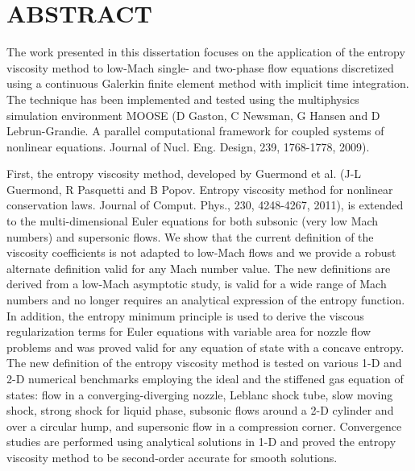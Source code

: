 %
%
%

\chapter*{ABSTRACT}

\pagestyle{plain} %
\setcounter{page}{2}

The work presented in this dissertation focuses on the application of the entropy viscosity method to low-Mach single- and two-phase flow equations discretized using a continuous Galerkin finite element method with implicit time integration. The technique has been implemented and tested using the multiphysics simulation environment MOOSE (D Gaston, C Newsman, G Hansen and D Lebrun-Grandie. A parallel computational framework for coupled systems of nonlinear equations. Journal of Nucl. Eng. Design, 239, 1768-1778, 2009).

First,  
the entropy viscosity method, developed by Guermond et al. (J-L Guermond, R Pasquetti and B Popov. Entropy viscosity method for nonlinear conservation laws. Journal of Comput. Phys., 230, 4248-4267, 2011), is extended to the multi-dimensional Euler 
equations for both subsonic (very low Mach numbers) and supersonic flows. 
We show that the current definition of the viscosity coefficients is not adapted to low-Mach flows 
and we provide a robust alternate definition valid for any Mach number value. The new definitions are derived from a 
low-Mach asymptotic study, is valid for a wide range of Mach numbers and no longer requires an analytical expression of the entropy function. In addition, the entropy minimum principle is used to derive 
the viscous regularization terms for Euler equations with variable area for nozzle flow problems and was proved valid for any equation of state with a concave entropy. 
The new definition of the entropy viscosity method is tested on various 1-D and 2-D numerical benchmarks employing the ideal and the stiffened gas equation of states: flow in a converging-diverging nozzle, Leblanc shock tube, slow moving 
shock, strong shock for liquid phase, subsonic flows around a 2-D cylinder and over a circular hump, and supersonic flow in a 
compression corner. Convergence studies are performed using analytical solutions in 1-D and proved the entropy viscosity method to be second-order accurate for smooth solutions.

